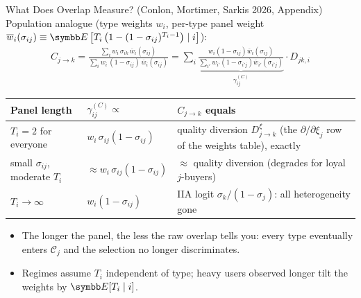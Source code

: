 \documentclass[aspectratio=169,10pt]{beamer}
\begin{document}
\begin{frame}{What Does Overlap Measure? (Conlon, Mortimer, Sarkis 2026, Appendix)}
\small
Population analogue (type weights $w_i$, per-type panel weight $\overline{w}_i(\sigma_{ij}) \equiv \E\left[T_i \left(1-(1-\sigma_{ij})^{T_i-1}\right) \mid i\right]$):
\begin{align*}
C_{j \rightarrow k} = \frac{\sum_i w_i\, \sigma_{ik}\, \overline{w}_i(\sigma_{ij})}{\sum_i w_i\, (1-\sigma_{ij})\, \overline{w}_i(\sigma_{ij})}
= \sum_i \underbrace{\frac{w_i (1-\sigma_{ij}) \overline{w}_i(\sigma_{ij})}{\sum_{i'} w_{i'} (1-\sigma_{i'j}) \overline{w}_{i'}(\sigma_{i'j})}}_{\gamma_{ij}^{(C)}} \cdot D_{jk,i}
\end{align*}
\vspace{-0.2cm}
\begin{center}
\renewcommand{\arraystretch}{1.2}
\begin{tabular}{lll}
\toprule
Panel length & $\gamma_{ij}^{(C)} \propto$ & $C_{j \rightarrow k}$ equals \\
\midrule
$T_i = 2$ for everyone & $w_i\, \sigma_{ij} (1-\sigma_{ij})$ & \alert{quality diversion} $D^{\xi}_{j \rightarrow k}$ (the $\partial/\partial \xi_j$ row of the weights table), exactly \\
small $\sigma_{ij}$, moderate $T_i$ & $\approx w_i\, \sigma_{ij} (1-\sigma_{ij})$ & $\approx$ quality diversion (degrades for loyal $j$-buyers) \\
$T_i \rightarrow \infty$ & $w_i (1-\sigma_{ij})$ & \alert{IIA logit} $\sigma_k/(1-\sigma_j)$: all heterogeneity gone \\
\bottomrule
\end{tabular}
\end{center}
\begin{itemize}
    \item The longer the panel, the \alert{less} the raw overlap tells you: every type eventually enters $\mathcal{C}_j$ and the selection no longer discriminates.
    \item Regimes assume $T_i$ independent of type; heavy users observed longer tilt the weights by $\E[T_i \mid i]$.
\end{itemize}
\end{frame}
\end{document}
